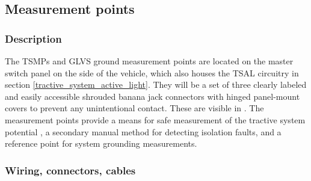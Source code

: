 \documentclass{article}
\begin{document}
\subsection{Measurement points}\label{measurement_points}
\subsubsection{Description}
The TSMPs and GLVS ground measurement points are located on the master switch panel on the side of the vehicle, which also houses the TSAL circuitry in section \ref{tractive_system_active_light}. They will be a set of three clearly labeled and easily accessible shrouded banana jack connectors with hinged panel-mount covers to prevent any unintentional contact. These are visible in . The measurement points provide a means for safe measurement of the tractive system potential , a secondary manual method for detecting isolation faults, and a reference point for system grounding  measurements. 


\subsubsection{Wiring, connectors, cables}
\end{document}
